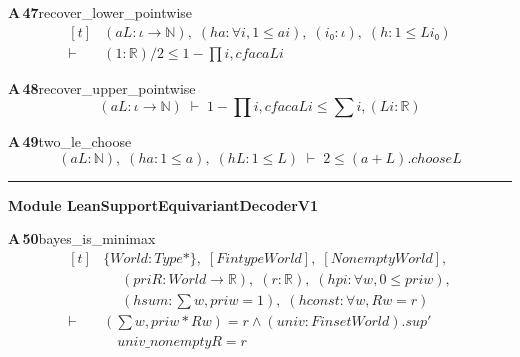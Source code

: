 \documentclass[conference]{IEEEtran}
\theoremstyle{definition}
\newcommand{\lean}[1]{\textsf{\footnotesize #1}}
\begin{document}
\noindent\textbf{A\,47}\quad\lean{recover\_lower\_pointwise}
{\footnotesize\[ \begin{aligned}[t]
&(\mathit{a} \mathit{L} : \iota \to \mathbb{N} ),\; (\mathit{ha} : \forall \mathit{i}, 1 \leq \mathit{a} \mathit{i}),\; (\mathit{i₀} : \iota ),\; (\mathit{h} : 1 \leq \mathit{L} \mathit{i₀})\\
\vdash\;&(1:\mathbb{R} ) / 2 \leq 1 - \textstyle\prod \mathit{i}, \mathit{cfac} \mathit{a} \mathit{L} \mathit{i}
\end{aligned} \]}

\noindent\textbf{A\,48}\quad\lean{recover\_upper\_pointwise}
{\footnotesize\[ (\mathit{a} \mathit{L} : \iota \to \mathbb{N} ) \;\vdash\; 1 - \textstyle\prod \mathit{i}, \mathit{cfac} \mathit{a} \mathit{L} \mathit{i} \leq \textstyle\sum \mathit{i}, (\mathit{L} \mathit{i} : \mathbb{R} ) \]}

\noindent\textbf{A\,49}\quad\lean{two\_le\_choose}
{\footnotesize\[ (\mathit{a} \mathit{L} : \mathbb{N} ),\; (\mathit{ha} : 1 \leq \mathit{a}),\; (\mathit{hL} : 1 \leq \mathit{L}) \;\vdash\; 2 \leq (\mathit{a} + \mathit{L}).\mathit{choose} \mathit{L} \]}

\vspace{4pt}\noindent\rule{\columnwidth}{0.4pt}\par\vspace{2pt}
\noindent\textbf{Module \lean{LeanSupportEquivariantDecoderV1}}\par\vspace{3pt}

\noindent\textbf{A\,50}\quad\lean{bayes\_is\_minimax}
{\footnotesize\[ \begin{aligned}[t]
&\{ \mathit{World} : \mathit{Type}*\},\; [\mathit{Fintype} \mathit{World}],\; [\mathit{Nonempty} \mathit{World}],\\
&\quad \; (\mathit{pri} \mathit{R} : \mathit{World} \to \mathbb{R} ),\; (\mathit{r} : \mathbb{R} ),\; (\mathit{hpi} : \forall \mathit{w}, 0 \leq \mathit{pri} \mathit{w}),\\
&\quad \; (\mathit{hsum} : \textstyle\sum \mathit{w}, \mathit{pri} \mathit{w} = 1),\; (\mathit{hconst} : \forall \mathit{w}, \mathit{R} \mathit{w} = \mathit{r})\\
\vdash\;&(\textstyle\sum \mathit{w}, \mathit{pri} \mathit{w} * \mathit{R} \mathit{w}) = \mathit{r} \wedge (\mathit{univ} : \mathit{Finset} \mathit{World}).\mathit{sup'}\\
&\quad \mathit{univ\_nonempty} \mathit{R} = \mathit{r}
\end{aligned} \]}
\end{document}
